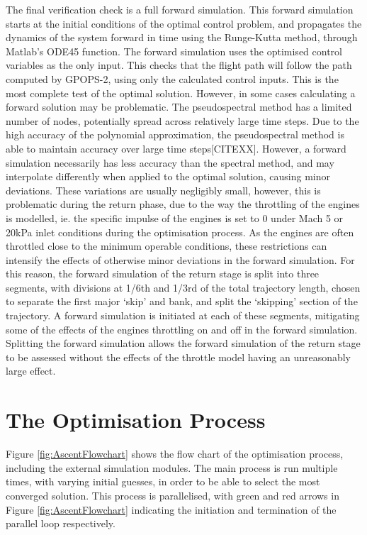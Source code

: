  The final verification check is a full forward simulation. This forward simulation starts at the initial conditions of the optimal control problem, and propagates the dynamics of the system forward in time using the Runge-Kutta method, through Matlab's ODE45 function. The forward simulation uses the optimised control variables as the only input. 
This checks that the flight path will follow the path computed by GPOPS-2, using only the calculated control inputs. This is the most complete test of the optimal solution. However, in some cases calculating a forward solution may be problematic. The pseudospectral method has a limited number of nodes, potentially spread across relatively large time steps. Due to the high accuracy of the polynomial approximation, the pseudospectral method is able to maintain accuracy over large time steps[CITEXX]. However, a forward simulation necessarily has less accuracy than the spectral method, and may interpolate differently when applied to the optimal solution, causing minor deviations. These variations are usually negligibly small, however, this is problematic during the return phase, due to the way the throttling of the engines is modelled, ie. the specific impulse of the engines is set to 0 under Mach 5 or 20kPa inlet conditions during the optimisation process. As the engines are often throttled close to the minimum operable conditions, these restrictions can intensify the effects of otherwise minor deviations in the forward simulation.
 For this reason, the forward simulation of the return stage is split into three segments, with divisions at 1/6th and 1/3rd of the total trajectory length, chosen to separate the first major `skip' and bank, and split the `skipping' section of the trajectory. A forward simulation is initiated at each of these segments, mitigating some of the effects of the engines throttling on and off in the forward simulation. 
Splitting the forward simulation allows the forward simulation of the return stage to be assessed without the effects of the throttle model having an unreasonably large effect. 


\section{The Optimisation Process}

Figure \ref{fig:AscentFlowchart} shows the flow chart of the optimisation process, including the external simulation modules. The main process is run multiple times, with varying initial guesses, in order to be able to select the most converged solution. This process is parallelised, with green and red arrows in Figure \ref{fig:AscentFlowchart} indicating the initiation and termination of the parallel loop respectively. 



